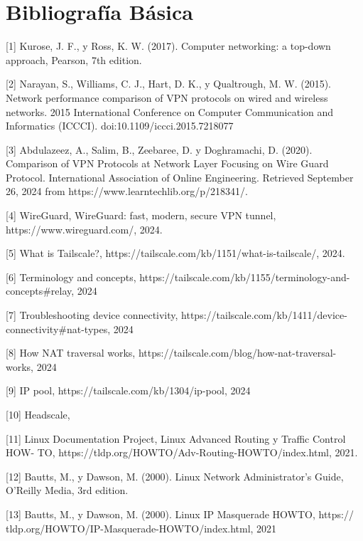\documentclass[letterpaper,12pt,oneside]{book}
\begin{document}
\section{Bibliografía Básica}
[1] Kurose, J. F., y Ross, K. W. (2017). Computer networking: a top-down approach,
Pearson, 7th edition.

[2] Narayan, S., Williams, C. J., Hart, D. K., y Qualtrough, M. W. (2015). Network performance comparison of VPN protocols on wired and wireless networks. 2015 International Conference on Computer Communication and Informatics (ICCCI). doi:10.1109/iccci.2015.7218077

[3]  Abdulazeez, A., Salim, B., Zeebaree, D. y Doghramachi, D. (2020). Comparison of VPN Protocols at Network Layer Focusing on Wire Guard Protocol. International Association of Online Engineering. Retrieved September 26, 2024 from https://www.learntechlib.org/p/218341/. 

[4] WireGuard, WireGuard: fast, modern, secure VPN tunnel, https://www.wireguard.com/, 2024.

[5] What is Tailscale?, https://tailscale.com/kb/1151/what-is-tailscale/, 2024.

[6] Terminology and concepts, https://tailscale.com/kb/1155/terminology-and-concepts\#relay, 2024

[7] Troubleshooting device connectivity, https://tailscale.com/kb/1411/device-connectivity\#nat-types, 2024

[8] How NAT traversal works, https://tailscale.com/blog/how-nat-traversal-works, 2024

[9] IP pool, https://tailscale.com/kb/1304/ip-pool, 2024

[10] Headscale, 

[11] Linux Documentation Project, Linux Advanced Routing y Traffic Control HOW-
TO, https://tldp.org/HOWTO/Adv-Routing-HOWTO/index.html, 2021.  

[12] Bautts, M., y Dawson, M. (2000). Linux Network Administrator’s Guide, O’Reilly
Media, 3rd edition.

[13] Bautts, M., y Dawson, M. (2000). Linux IP Masquerade HOWTO, https://
tldp.org/HOWTO/IP-Masquerade-HOWTO/index.html, 2021
\end{document}

